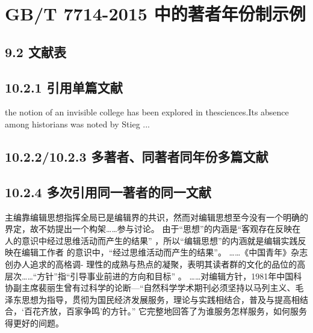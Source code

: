\documentclass{article}
\begin{document}
\section*{GB/T 7714-2015 中的著者年份制示例}


\subsection*{9.2 文献表}
\begin{refsection}

\nocite{尼葛洛庞帝1996--,汪冰1997-16-16,杨宗英1996-24-29,Baker1995--,Chernik1982--,Dowler1995-5-26}

\printbibliography[heading=subbibliography]
\end{refsection}

\subsection*{10.2.1 引用单篇文献}
\begin{refsection}

the notion of an invisible college has been explored in thesciences\cite{CRANE1972--}.Its absence among historians was noted by Stieg ...

\printbibliography[heading=subbibliography]
\end{refsection}



\subsection*{10.2.2/10.2.3 多著者、同著者同年份多篇文献}
\begin{refsection}

\nocite{王临慧2010-147,王临慧2010-138}
\nocite{KENNEDY1975-311-386,KENNEDY1975-339-360}


\printbibliography[heading=subbibliography]
\end{refsection}

\subsection*{10.2.4 多次引用同一著者的同一文献}
\begin{refsection}
主编靠编辑思想指挥全局已是编辑界的共识\cite{张忠智1997-33-34}，然而对编辑思想至今没有一个明确的界定，故不妨提出一个构架……参与讨论。
由于“思想”的内涵是“客观存在反映在人的意识中经过思维活动而产生的结果”
，所以“编辑思想”的内涵就是编辑实践反映在编辑工作者
的意识中，“经过思维活动而产生的结果”。
……《中国青年》杂志创办人追求的高格调-
理性的成熟与热点的凝聚\cite{刘彻东1998-38-39}，表明其读者群的文化的品位的高层次……“方针”指“引导事业前进的方向和目标”
。
……对编辑方针，1981年中国科协副主席裴丽生曾有过科学的论断—“自然科学学术期刊必须坚持以马列主义、毛泽东思想为指导，贯彻为国民经济发展服务，理论与实践相结合，普及与提高相结合，‘百花齐放，百家争鸣’的方针。” \cite{裴丽生1981-2-10}它完整地回答了为谁服务怎样服务，如何服务得更好的间题。

\printbibliography[heading=subbibliography]
\end{refsection}
\end{document}
